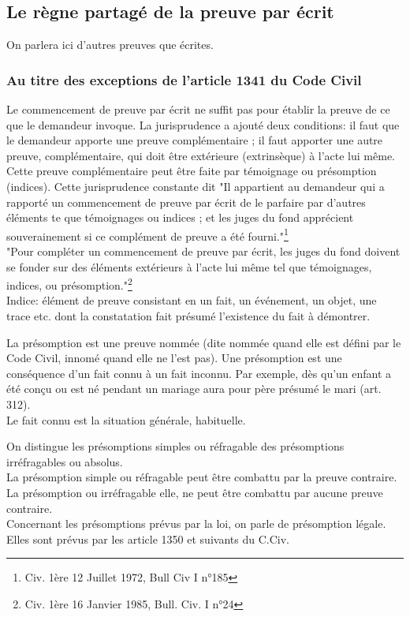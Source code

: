 \subsection{Le règne partagé de la preuve par écrit}

On parlera ici d'autres preuves que écrites. 

\subsubsection{Au titre des exceptions de l'article 1341 du Code Civil}

Le commencement de preuve par écrit ne suffit pas pour établir la preuve de ce que le demandeur invoque. La jurisprudence a ajouté deux conditions: il faut que le demandeur apporte une preuve complémentaire ; il faut apporter une autre preuve, complémentaire, qui doit être extérieure (extrinsèque) à l'acte lui même. \\
Cette preuve complémentaire peut être faite par témoignage ou présomption (indices). Cette jurisprudence constante dit "Il appartient au demandeur qui a rapporté un commencement de preuve par écrit de le parfaire par d'autres éléments te que témoignages ou indices ; et les juges du fond apprécient souverainement si ce complément de preuve a été fourni."\footnote{Civ. 1ère 12 Juillet 1972, Bull Civ I n°185} \\
"Pour compléter un commencement de preuve par écrit, les juges du fond doivent se fonder sur des éléments extérieurs à l'acte lui même tel que témoignages, indices, ou présomption."\footnote{Civ. 1ère 16 Janvier 1985, Bull. Civ. I n°24} \\
Indice: élément de preuve consistant en un fait, un événement, un objet, une trace etc. dont la constatation fait présumé l'existence du fait à démontrer. 


La présomption est une preuve nommée (dite nommée quand elle est défini par le Code Civil, innomé quand elle ne l'est pas). Une présomption est une conséquence d'un fait connu à un fait inconnu. Par exemple, dès qu'un enfant a été conçu ou est né pendant un mariage aura pour père présumé le mari (art. 312). \\
Le fait connu est la situation générale, habituelle. 


On distingue les présomptions simples ou réfragable des présomptions irréfragables ou absolus. \\
La présomption simple ou réfragable peut être combattu par la preuve contraire. \\
La présomption ou irréfragable elle, ne peut être combattu par aucune preuve contraire. \\
Concernant les présomptions prévus par la loi, on parle de présomption légale. Elles sont prévus par les article 1350 et suivants du C.Civ. \\

